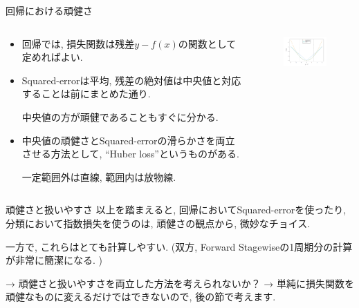 \documentclass[dvipdfmx,8pt]{beamer}
\begin{document}
  \begin{frame}{回帰における頑健さ}
    \begin{columns}[t]
      \begin{column}{0.5\linewidth}
        \begin{itemize}
          \item 回帰では, 損失関数は残差$y-f(x)$の関数として定めればよい.
          \item Squared-errorは平均, 残差の絶対値は中央値と対応することは前にまとめた通り.

          中央値の方が頑健であることもすぐに分かる.

          \item 中央値の頑健さとSquared-errorの滑らかさを両立させる方法として, ``Huber loss''というものがある.

          一定範囲外は直線, 範囲内は放物線.
        \end{itemize}
      \end{column}
      \begin{column}{0.5\linewidth}
        \begin{figure}[htb]
          \centering
          \includegraphics[width=5cm,clip]{images/RobustnessRegression.png}
        \end{figure}
      \end{column}
    \end{columns}
  \end{frame}
  \begin{frame}{頑健さと扱いやすさ}
    以上を踏まえると, 回帰においてSquared-errorを使ったり, 分類において指数損失を使うのは, 頑健さの観点から, 微妙なチョイス.

    一方で, これらはとても計算しやすい.
    (双方, Forward Stagewiseの1周期分の計算が非常に簡潔になる. )

    → 頑健さと扱いやすさを両立した方法を考えられないか？
    → 単純に損失関数を頑健なものに変えるだけではできないので, 後の節で考えます.
  \end{frame}
\end{document}
